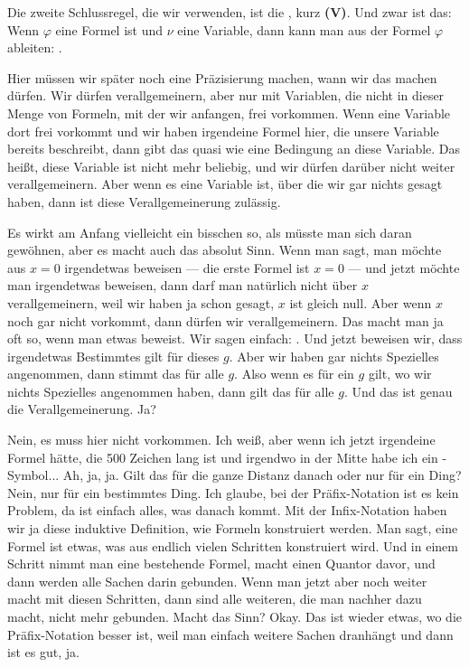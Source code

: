 \begin{spoken-clean}[00:15:45 - 00:18:00]
Die zweite Schlussregel, die wir verwenden, ist die , kurz \textbf{(V)}. Und zwar ist das: Wenn $\varphi$ eine Formel ist und $\nu$ eine Variable, dann kann man aus der Formel $\varphi$ ableiten: .

Hier müssen wir später noch eine Präzisierung machen, wann wir das machen dürfen. Wir dürfen verallgemeinern, aber nur mit Variablen, die nicht in dieser Menge von Formeln, mit der wir anfangen, frei vorkommen. Wenn eine Variable dort frei vorkommt und wir haben irgendeine Formel hier, die unsere Variable bereits beschreibt, dann gibt das quasi wie eine Bedingung an diese Variable. Das heißt, diese Variable ist nicht mehr beliebig, und wir dürfen darüber nicht weiter verallgemeinern. Aber wenn es eine Variable ist, über die wir gar nichts gesagt haben, dann ist diese Verallgemeinerung zulässig.

Es wirkt am Anfang vielleicht ein bisschen so, als müsste man sich daran gewöhnen, aber es macht auch das absolut Sinn. Wenn man sagt, man möchte aus $x=0$ irgendetwas beweisen --- die erste Formel ist $x=0$ --- und jetzt möchte man irgendetwas beweisen, dann darf man natürlich nicht über $x$ verallgemeinern, weil wir haben ja schon gesagt, $x$ ist gleich null. Aber wenn $x$ noch gar nicht vorkommt, dann dürfen wir verallgemeinern. Das macht man ja oft so, wenn man etwas beweist. Wir sagen einfach: . Und jetzt beweisen wir, dass irgendetwas Bestimmtes gilt für dieses $g$. Aber wir haben gar nichts Spezielles angenommen, dann stimmt das für alle $g$. Also wenn es für ein $g$ gilt, wo wir nichts Spezielles angenommen haben, dann gilt das für alle $g$. Und das ist genau die Verallgemeinerung. Ja?


Nein, es muss hier nicht vorkommen. Ich weiß, aber wenn ich jetzt irgendeine Formel hätte, die 500 Zeichen lang ist und irgendwo in der Mitte habe ich ein -Symbol... Ah, ja, ja. Gilt das für die ganze Distanz danach oder nur für ein Ding? Nein, nur für ein bestimmtes Ding. Ich glaube, bei der Präfix-Notation ist es kein Problem, da ist einfach alles, was danach kommt. Mit der Infix-Notation haben wir ja diese induktive Definition, wie Formeln konstruiert werden. Man sagt, eine Formel ist etwas, was aus endlich vielen Schritten konstruiert wird. Und in einem Schritt nimmt man eine bestehende Formel, macht einen Quantor davor, und dann werden alle Sachen darin gebunden. Wenn man jetzt aber noch weiter macht mit diesen Schritten, dann sind alle weiteren, die man nachher dazu macht, nicht mehr gebunden. Macht das Sinn? Okay. Das ist wieder etwas, wo die Präfix-Notation besser ist, weil man einfach weitere Sachen dranhängt und dann ist es gut, ja.


\end{spoken-clean}
